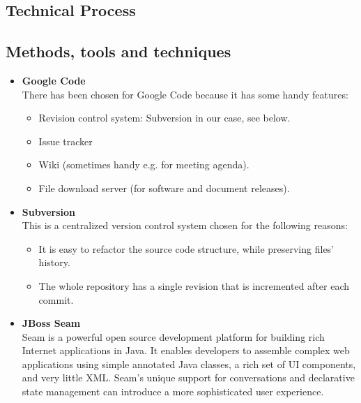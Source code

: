\documentclass[salesmen, twoside]{../../../templates/latex/2009/softproj}
\begin{document}
\begin{projdoc}
			
	\chapter{Technical Process}
	
			\section{Methods, tools and techniques}
			
			\begin{itemize}
				
				\item \textbf{Google Code} \\
				There has been chosen for Google Code because it has some 
				handy features:
				
				\begin{itemize}
			 		\item Revision control system: Subversion in our case, see below.
					\item Issue tracker
					\item Wiki (sometimes handy e.g. for meeting agenda).
					\item File download server (for software and document releases).
				\end{itemize}

				\item \textbf{Subversion} \\
				This is a centralized version control system chosen for the 
				following reasons:
				
				\begin{itemize}
					\item It is easy to refactor the source code structure, 
					while preserving files' history.
					\item The whole repository has a single revision that is 
					incremented after each commit.
				\end{itemize}
				
				\item \textbf{JBoss Seam} \\
				Seam is a powerful open source development platform for building rich Internet applications in Java. 
				It enables developers to assemble complex web applications using simple annotated Java classes, 
				a rich set of UI components, and very little XML. 
				Seam’s unique support for conversations and declarative state management can introduce a more 
				sophisticated user experience.
				


\end{itemize}
\end{projdoc}
\end{document}
